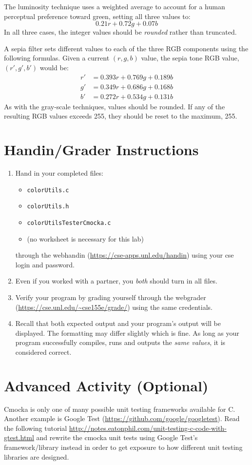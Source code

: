 \documentclass[12pt]{scrartcl}
\begin{document}
The luminosity technique uses a weighted average to account for a human 
perceptual preference toward green, setting all three values to:
  $$0.21 r + 0.72 g + 0.07 b$$
In all three cases, the integer values should be \emph{rounded} rather 
than truncated.

A sepia filter sets different values to each of the three RGB components 
using the following formulas.  Given a current $(r,g,b)$ value, the sepia
tone RGB value, $(r',g',b')$ would be:
$$\begin{array}{ll}
  r' &= 0.393r + 0.769g + 0.189b \\
  g' &= 0.349r + 0.686g + 0.168b \\
  b' &= 0.272r + 0.534g + 0.131b
\end{array}$$
As with the gray-scale techniques, values should be rounded.  If any of
the resulting RGB values exceeds 255, they should be reset to the 
maximum, 255.

\section{Handin/Grader Instructions}

\begin{enumerate}
  \item Hand in your completed files:
  \begin{itemize}
    \item \texttt{colorUtils.c}
    \item \texttt{colorUtils.h}
    \item \texttt{colorUtilsTesterCmocka.c}
    \item (no worksheet is necessary for this lab)
  \end{itemize}
  through the webhandin (\url{https://cse-apps.unl.edu/handin}) 
  using your cse login and password.  
  \item Even if you worked with a partner, you \emph{both} should
  turn in all files.
  \item Verify your program by grading yourself through the
  webgrader (\url{https://cse.unl.edu/~cse155e/grade/}) using the
  same credentials.
  \item Recall that both expected output and your program's output
  will be displayed.  The formatting may differ slightly which is fine.
  As long as your program successfully compiles, runs and outputs 
  the \emph{same values}, it is considered correct.
\end{enumerate}

\section{Advanced Activity (Optional)}

Cmocka is only one of many possible unit testing frameworks available
for C.  Another example is Google Test 
(\url{https://github.com/google/googletest}).  Read the following tutorial 
\url{http://notes.eatonphil.com/unit-testing-c-code-with-gtest.html} and
rewrite the cmocka unit tests using Google Test's framework/library instead
in order to get exposure to how different unit testing libraries are designed.
\end{document}
